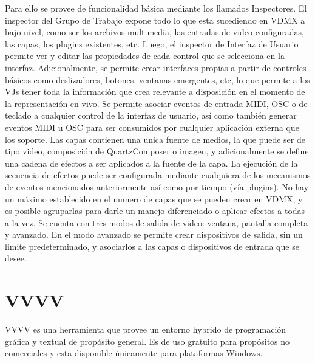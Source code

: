 Para ello se provee de funcionalidad básica mediante los llamados Inspectores. El inspector del Grupo de Trabajo expone todo lo que esta sucediendo en VDMX a bajo nivel, como ser los archivos multimedia, las entradas de video configuradas, las capas, los plugins existentes, etc. Luego, el inspector de Interfaz de Usuario permite ver y editar las propiedades de cada control que se selecciona en la interfaz. Adicionalmente, se permite crear interfaces propias a partir de controles básicos como deslizadores, botones, ventanas emergentes, etc, lo que permite a los VJs tener toda la información que crea relevante a disposición en el momento de la representación en vivo.
Se permite asociar eventos de entrada MIDI, OSC o de teclado a cualquier control de la interfaz de usuario, así como también generar eventos MIDI u OSC para ser consumidos por cualquier aplicación externa que los soporte.
Las capas contienen una unica fuente de medios, la que puede ser de tipo video, composición de QuartzComposer o imagen, y adicionalmente se define una cadena de efectos a ser aplicados a la fuente de la capa. La ejecución de la secuencia de efectos puede ser configurada mediante cualquiera de los mecanismos de eventos mencionados anteriormente así como por tiempo (vía plugins). No hay un máximo establecido en el numero de capas que se pueden crear en VDMX, y es posible agruparlas para darle un manejo diferenciado o aplicar efectos a todas a la vez.
Se cuenta con tres modos de salida de video: ventana, pantalla completa y avanzado. En el modo avanzado se permite crear dispositivos de salida, sin un limite predeterminado, y asociarlos a las capas o dispositivos de entrada que se desee.
\section{VVVV}
VVVV\cite{VVVV} es una herramienta que provee un entorno hybrido de programación gráfica y textual de propósito general. Es de uso gratuito para propósitos no comerciales y esta disponible únicamente para plataformas Windows.

